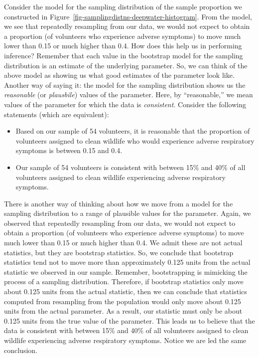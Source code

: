 \documentclass[
  letterpaper,
  DIV=11,
  numbers=noendperiod]{scrreprt}
\providecommand{\tightlist}{%
  \setlength{\itemsep}{0pt}\setlength{\parskip}{0pt}}\usepackage{longtable,booktabs,array}
\theoremstyle{plain}
\theoremstyle{definition}
\theoremstyle{definition}
\theoremstyle{remark}
\begin{document}
Consider the model for the sampling distribution of the sample
proportion we constructed in
Figure~\ref{fig-samplingdistns-deepwater-histogram}. From the model, we
see that repeatedly resampling from our data, we would not expect to
obtain a proportion (of volunteers who experience adverse symptoms) to
move much lower than 0.15 or much higher than 0.4. How does this help us
in performing inference? Remember that each value in the bootstrap model
for the sampling distribution is an estimate of the underlying
parameter. So, we can think of the above model as showing us what good
estimates of the parameter look like. Another way of saying it: the
model for the sampling distribution shows us the \emph{reasonable} (or
\emph{plausbile}) values of the parameter. Here, by ``reasonable,'' we
mean values of the parameter for which the data is \emph{consistent}.
Consider the following statements (which are equivalent):

\begin{itemize}
\tightlist
\item
  Based on our sample of 54 volunteers, it is reasonable that the
  proportion of volunteers assigned to clean wildlife who would
  experience adverse respiratory symptoms is between 0.15 and 0.4.
\item
  Our sample of 54 volunteers is consistent with between 15\% and 40\%
  of all volunteers assigned to clean wildlife experiencing adverse
  respiratory symptoms.
\end{itemize}

There is another way of thinking about how we move from a model for the
sampling distribution to a range of plausible values for the parameter.
Again, we observed that repeatedly resampling from our data, we would
not expect to obtain a proportion (of volunteers who experience adverse
symptoms) to move much lower than 0.15 or much higher than 0.4. We admit
these are not actual statistics, but they are bootstrap statistics. So,
we conclude that bootstrap statistics tend not to move more than
approximately 0.125 units from the actual statistic we observed in our
sample. Remember, bootstrapping is mimicking the process of a sampling
distribution. Therefore, if bootstrap statistics only move about 0.125
units from the actual statistic, then we can conclude that statistics
computed from resampling from the population would only move about 0.125
units from the actual parameter. As a result, our statistic must only be
about 0.125 units from the true value of the parameter. This leads us to
believe that the data is consistent with between 15\% and 40\% of all
volunteers assigned to clean wildlife experiencing adverse respiratory
symptoms. Notice we are led the same conclusion.
\end{document}
